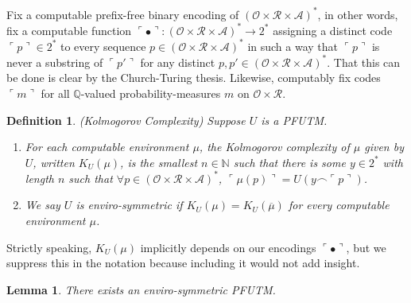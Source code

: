 \documentclass{article}
\newtheorem{definition}[theorem]{Definition}
\newtheorem{lemma}[theorem]{Lemma}
\begin{document}
Fix a computable prefix-free binary encoding of
$(\mathcal O\times \mathcal R\times\mathcal A)^*$, in other words,
fix a computable function
$\ulcorner\bullet\urcorner:(\mathcal O\times \mathcal R\times\mathcal A)^*\to 2^*$
assigning a distinct code $\ulcorner p\urcorner\in 2^*$ to every sequence
$p\in (\mathcal O\times \mathcal R\times\mathcal A)^*$ in such a way that
$\ulcorner p\urcorner$ is never a substring of $\ulcorner p'\urcorner$
for any distinct $p,p'\in (\mathcal O\times \mathcal R\times\mathcal A)^*$.
That this can be done is clear by the Church-Turing thesis.
Likewise, computably fix codes $\ulcorner m\urcorner$ for all
$\mathbb Q$-valued probability-measures $m$ on $\mathcal O\times\mathcal R$.

\begin{definition}
(Kolmogorov Complexity)
Suppose $U$ is a PFUTM.
\begin{enumerate}
    \item
    For each computable environment $\mu$, the \emph{Kolmogorov complexity of $\mu$
    given by $U$}, written $K_U(\mu)$, is the smallest $n\in\mathbb N$ such that
    there is some $y\in 2^*$ with length $n$ such that
    $\forall p\in (\mathcal O\times \mathcal R\times\mathcal A)^*$,
    $\ulcorner\mu(p)\urcorner=U(y\frown\ulcorner p\urcorner)$.
    \item
    We say $U$ is \emph{enviro-symmetric} if
    $K_U(\mu)=K_U(\overline\mu)$ for every computable environment $\mu$.
\end{enumerate}
\end{definition}

Strictly speaking, $K_U(\mu)$ implicitly depends on our encodings
$\ulcorner \bullet\urcorner$, but we suppress this in the notation because
including it would not add insight.

\begin{lemma}
\label{envirosymmetricexistencelemma}
    There exists an enviro-symmetric PFUTM.
\end{lemma}
\end{document}
